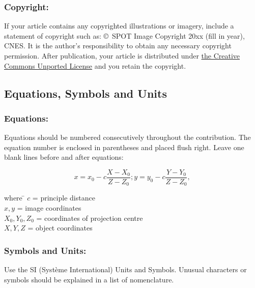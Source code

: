 \documentclass{isprs} %
\begin{document}
\subsubsection{Copyright:}\label{sec:Copyright}

If your article contains any copyrighted illustrations or imagery, 
include a statement of copyright such as: \copyright~SPOT Image Copyright 20xx 
(fill in year), CNES\@. It is the author's responsibility to obtain any necessary 
copyright permission. After publication, your article is distributed under \underline{the Creative 
Commons Unported License} and you retain the copyright.


\subsection{Equations, Symbols and Units}\label{sec:Equations, Symbols and Units}

\subsubsection{Equations:}\label{sec:Equations}

Equations should be numbered consecutively throughout the contribution. The equation 
number is enclosed in parentheses and placed flush right. Leave one blank lines 
before and after equations: 


\begin{equation}\label{equ:1}
	x = x_0 -c \frac{X - X_0}{Z - Z_0}; y = y_0 -c \frac{Y - Y_0}{Z - Z_0},
\end{equation}

\begin{tabbing} 
where \hspace{0.6cm} \= $c$ = principle distance\\
\> $x,y$ = image coordinates\\
\> $X_0,Y_0, Z_0$ = coordinates of projection centre\\
\> $X, Y, Z$ = object coordinates
\end{tabbing}

\subsubsection{Symbols and Units:}\label{sec:Symbols and Units}
Use the SI (Syst\`{e}me International) Units and Symbols. Unusual characters 
or symbols should be explained in a list of nomenclature.
\end{document}
